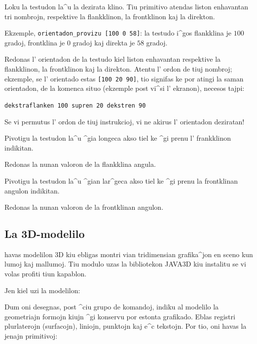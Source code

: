 
Loku la testudon la^u la dezirata klino.  Tiu primitivo atendas liston
enhavantan tri nombrojn, respektive la flankklinon, la frontklinon kaj
la direkton.

Ekzemple, \texttt{orientadon\_provizu [100 0 58]}: la testudo i^gos
flankklina je $100$ gradoj, frontklina je $0$ gradoj kaj direkta je
$58$ gradoj.


Redonas l' orientadon de la testudo kiel liston enhavantan respektive
la flankklinon, la frontklinon kaj la direkton.  Atentu l' ordon de
tiuj nombroj; ekzemple, se l' orientado estas \texttt{[100 20 90]},
tio signifas ke por atingi la saman orientadon, de la komenca situo
(ekzemple post vi^si l' ekranon), necesos tajpi:

\begin{center}
  \texttt{dekstraflanken 100 supren 20 dekstren 90}
\end{center}

Se vi permutus l' ordon de tiuj instrukcioj, vi ne akirus l'
orientadon deziratan!


Pivotigu la testudon la^u ^gia longeca akso tiel ke ^gi prenu l'
frankklinon indikitan.


Redonas la nunan valoron de la flankklina angula.


Pivotigu la testudon la^u ^gian lar^geca akso tiel ke ^gi prenu la
frontklinan angulon indikitan.


Redonas la nunan valoron de la frontklinan angulon.

\subsection{La 3D-modelilo}

\xlogo{} havas modelilon 3D kiu ebligas montri vian tridimensian
grafika^jon en sceno kun lumoj kaj mallumoj.  Tiu modulo uzas la
bibliotekon JAVA3D kiu instalitu se vi volas profiti tiun kapablon.

Jen kiel uzi la modelilon:

Dum oni desegnas, post ^ciu grupo de komandoj, indiku al modelilo 
la geometriajn formojn kiujn ^gi konservu por estonta grafikado.
Eblas registri plurlaterojn (surfacojn), liniojn, punktojn kaj e^c tekstojn. 
Por tio, oni havas la jenajn primitivoj:

